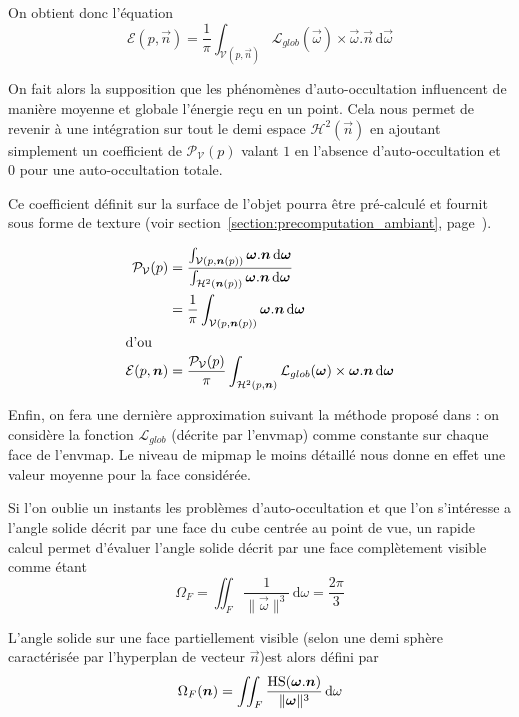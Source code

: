 \documentclass[10pt,a4paper,twoside, twocolumn]{report}
\begin{document}
On obtient donc l'équation
\begin{equation}
	\mathcal E(p, \vec n)=\frac{1}{\pi}\int_{\mathcal V(p, \vec n )}\mathcal L_{glob}(\vec\omega)\times\vec\omega.\vec n\, \mathrm d\vec\omega
\end{equation}

On fait alors la supposition que les phénomènes d'auto-occultation influencent de manière moyenne et globale l'énergie reçu en un point. Cela nous permet de revenir à une intégration sur tout le demi espace $\mathcal H^2(\vec{n})$ en ajoutant simplement un coefficient de $\mathcal P_{\mathcal V}(p)$ valant $1$ en l'absence d'auto-occultation et $0$ pour une auto-occultation totale.

Ce coefficient définit sur la surface de l'objet pourra être pré-calculé et fournit sous forme de texture (voir section~\ref{section:precomputation_ambiant}, page~\pageref{section:precomputation_ambiant}).

\begin{align}
	\mathcal P_{\mathcal V}(p)	&= \frac{\int_{\mathcal V(p, \vec n(p))}\vec\omega.\vec n\, \mathrm d\vec\omega}{\int_{\mathcal H^2(\vec n(p))}\vec\omega.\vec n\, \mathrm d\vec\omega}	\notag\\
															&= \frac{1}{\pi}\int_{\mathcal V(p, \vec n(p))}\vec\omega.\vec n\, \mathrm d\vec\omega \\
\intertext{d'ou}
	\mathcal E(p, \vec n)				&= \frac{\mathcal P_{\mathcal V}(p)}{\pi}\int_{\mathcal H^2(p, \vec n )}\mathcal L_{glob}(\vec\omega)\times\vec\omega.\vec n\, \mathrm d\vec\omega
\end{align}

Enfin, on fera une dernière approximation suivant la méthode proposé dans \cite{Mcguire} : on considère la fonction $\mathcal L_{glob}$ (décrite par l'envmap) comme constante sur chaque face de l'envmap. Le niveau de mipmap le moins détaillé nous donne en effet une valeur moyenne pour la face considérée.


Si l'on oublie un instants les problèmes d'auto-occultation et que l'on s'intéresse a l'angle solide décrit par une face du cube centrée au point de vue, un rapide calcul permet d'évaluer l'angle solide décrit par une face complètement visible comme étant 
\begin{equation}
	\Omega_F = \iint_{F}\frac{1}{\|\vec\omega\|^3}\, \mathrm d\omega = \frac{2\pi}{3}
\end{equation}

L'angle solide sur une face partiellement visible (selon une demi sphère caractérisée par l'hyperplan de vecteur $\vec n$)est alors défini par
\begin{equation}
	\Omega_F(\vec n) = \iint_{F}\frac{\Hs(\vec\omega.\vec n)}{\|\vec\omega\|^3}\, \mathrm d\omega
\end{equation}
\end{document}

